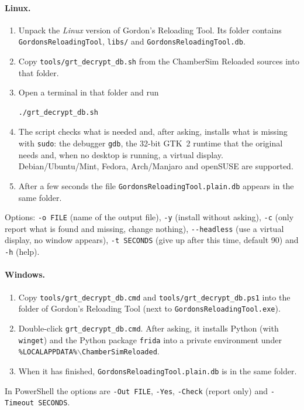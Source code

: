 \documentclass[11pt,a4paper]{article}
\newcommand{\file}[1]{\texttt{#1}}
\begin{document}
\paragraph{Linux.}
\begin{enumerate}
  \item Unpack the \emph{Linux} version of Gordon's Reloading Tool. Its folder contains \file{GordonsReloadingTool}, \file{libs/} and \file{GordonsReloadingTool.db}.
  \item Copy \file{tools/grt\_decrypt\_db.sh} from the ChamberSim Reloaded sources into that folder.
  \item Open a terminal in that folder and run
\begin{verbatim}
./grt_decrypt_db.sh
\end{verbatim}
  \item The script checks what is needed and, after asking, installs what is missing with \texttt{sudo}: the debugger \texttt{gdb}, the 32-bit GTK~2 runtime that the
        original needs and, when no desktop is running, a virtual display. Debian/Ubuntu/Mint, Fedora, Arch/Manjaro and openSUSE are supported.
  \item After a few seconds the file \file{GordonsReloadingTool.plain.db} appears in the same folder.
\end{enumerate}
Options: \texttt{-o FILE} (name of the output file), \texttt{-y} (install without asking), \texttt{-c} (only report what is found and missing, change nothing),
\texttt{-{}-headless} (use a virtual display, no window appears), \texttt{-t SECONDS} (give up after this time, default 90) and \texttt{-h} (help).

\paragraph{Windows.}
\begin{enumerate}
  \item Copy \file{tools/grt\_decrypt\_db.cmd} and \file{tools/grt\_decrypt\_db.ps1} into the folder of Gordon's Reloading Tool (next to \file{GordonsReloadingTool.exe}).
  \item Double-click \file{grt\_decrypt\_db.cmd}. After asking, it installs Python (with \texttt{winget}) and the Python package \texttt{frida} into a private environment
        under \texttt{\%LOCALAPPDATA\%$\backslash$ChamberSimReloaded}.
  \item When it has finished, \file{GordonsReloadingTool.plain.db} is in the same folder.
\end{enumerate}
In PowerShell the options are \texttt{-Out FILE}, \texttt{-Yes}, \texttt{-Check} (report only) and \texttt{-Timeout SECONDS}.
\end{document}
